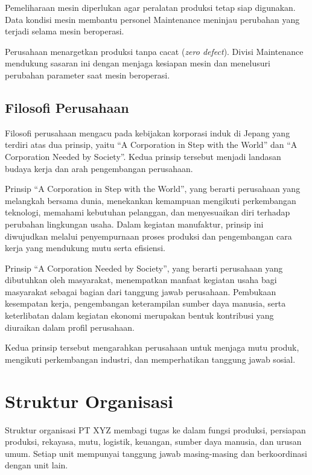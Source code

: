 Pemeliharaan mesin diperlukan agar peralatan produksi tetap siap digunakan. Data kondisi mesin membantu personel Maintenance meninjau perubahan yang terjadi selama mesin beroperasi.

Perusahaan menargetkan produksi tanpa cacat (\textit{zero defect}). Divisi
Maintenance mendukung sasaran ini dengan menjaga kesiapan mesin dan
menelusuri perubahan parameter saat mesin beroperasi.

\subsection{Filosofi Perusahaan}

Filosofi perusahaan mengacu pada kebijakan korporasi induk di Jepang yang terdiri atas dua prinsip, yaitu ``A Corporation in Step with the World'' dan ``A Corporation Needed by Society''. Kedua prinsip tersebut menjadi landasan budaya kerja dan arah pengembangan perusahaan.

Prinsip ``A Corporation in Step with the World'', yang berarti perusahaan yang melangkah bersama dunia, menekankan kemampuan mengikuti perkembangan teknologi, memahami kebutuhan pelanggan, dan menyesuaikan diri terhadap perubahan lingkungan usaha. Dalam kegiatan manufaktur, prinsip ini diwujudkan melalui penyempurnaan proses produksi dan pengembangan cara kerja yang mendukung mutu serta efisiensi.

Prinsip ``A Corporation Needed by Society'', yang berarti perusahaan yang dibutuhkan oleh masyarakat, menempatkan manfaat kegiatan usaha bagi masyarakat sebagai bagian dari tanggung jawab perusahaan. Pembukaan kesempatan kerja, pengembangan keterampilan sumber daya manusia, serta keterlibatan dalam kegiatan ekonomi merupakan bentuk kontribusi yang diuraikan dalam profil perusahaan.

Kedua prinsip tersebut mengarahkan perusahaan untuk menjaga mutu produk, mengikuti perkembangan industri, dan memperhatikan tanggung jawab sosial.

\section{Struktur Organisasi}

Struktur organisasi PT XYZ membagi tugas ke dalam fungsi produksi, persiapan produksi, rekayasa, mutu, logistik, keuangan, sumber daya manusia, dan urusan umum. Setiap unit mempunyai tanggung jawab masing-masing dan berkoordinasi dengan unit lain.

